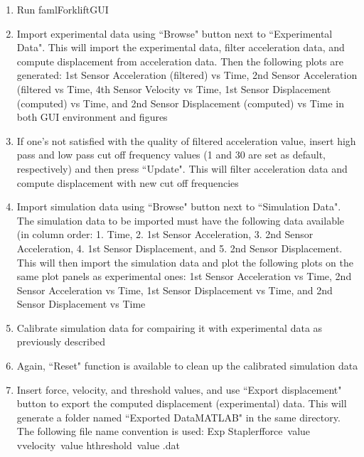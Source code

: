 \documentclass[12pt]{article}
\begin{document}
    \begin{enumerate}

        \item   Run faml\textunderscore Forklift\textunderscore GUI
        
        \item   Import experimental data using ``Browse" button next to ``Experimental Data". This will import
the experimental data, filter acceleration data, and compute displacement from acceleration data. Then
the following plots are generated: 1st Sensor Acceleration (filtered) vs Time, 2nd Sensor
Acceleration (filtered vs Time, 4th Sensor Velocity vs Time, 1st Sensor Displacement
(computed) vs Time, and 2nd Sensor Displacement (computed) vs Time in both GUI
environment and figures

        \item   If one's not satisfied with the quality of filtered
acceleration value, insert high pass and low pass cut off frequency values (1
and 30 are set as default, respectively) and then press ``Update". This will
filter acceleration data and compute displacement with new cut off frequencies

        \item  Import simulation data using ``Browse" button next to
``Simulation Data". The simulation data to be imported must have the following
data available (in column order: 1. Time, 2. 1st Sensor Acceleration, 3. 2nd
Sensor Acceleration, 4. 1st Sensor Displacement, and 5. 2nd Sensor
Displacement. This will then import the simulation data and plot the following
plots on the same plot panels as experimental ones: 1st Sensor Acceleration vs
Time, 2nd Sensor Acceleration vs Time, 1st Sensor Displacement vs Time, and 2nd
Sensor Displacement vs Time

        \item   Calibrate simulation data for compairing it with experimental data as previously described

        \item   Again, ``Reset" function is available to clean up the calibrated simulation data

        \item   Insert force, velocity, and threshold values, and use ``Export
displacement" button to export the computed displacement (experimental) data.
This will generate a folder named ``Exported Data\textunderscore MATLAB" in the
same directory. The following file name convention is used: Exp\textunderscore
Stapler\textunderscore f\textunderscore \langle force~value \rangle
\textunderscore v\textunderscore \langle velocity~value \rangle \textunderscore
h\textunderscore \langle threshold~value \rangle .dat

    \end{enumerate}
\end{document}

